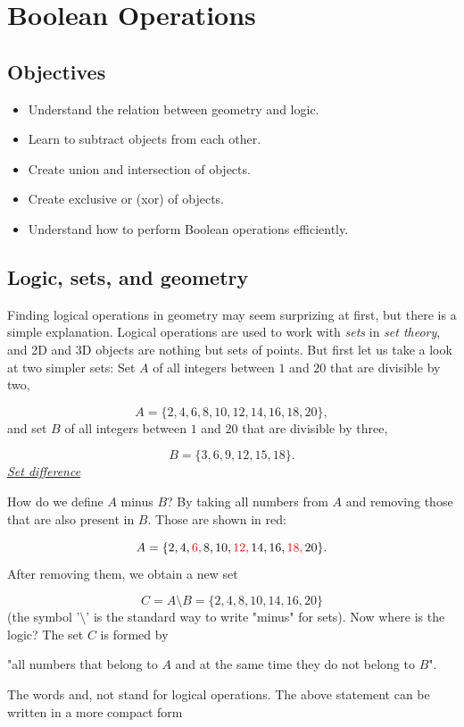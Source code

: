 \section{Boolean Operations}

\subsection{Objectives}
\begin{itemize}
\item Understand the relation between geometry and logic.
\item Learn to subtract objects from each other.
\item Create union and intersection of objects.
\item Create exclusive or (xor) of objects.
\item Understand how to perform Boolean operations efficiently.
\end{itemize}

\subsection{Logic, sets, and geometry}

Finding logical operations in geometry may seem surprizing at first, but there 
is a simple explanation. Logical operations are used to 
work with {\em sets} in {\em set theory}, and 2D and 3D objects are nothing 
but sets of points. But first let us take a look at two simpler sets: 
Set $A$ of all integers between $1$ and $20$ that are divisible by two,

$$
A = \{2, 4, 6, 8, 10, 12, 14, 16, 18, 20\},
$$
and set $B$ of all integers between $1$ and $20$ that are divisible by three,

$$
B = \{3, 6, 9, 12, 15, 18\}.
$$
\underline{\em Set difference}

How do we define $A$ minus $B$? By taking all numbers from $A$ 
and removing those that are also present in $B$. Those are shown in red: 

$$
A = \{2, 4, {\color{red}6,} \,8, 10, {\color{red}12,} \,14, 16, {\color{red}18,} \,20\}.
$$
After removing them, we obtain a new set

$$
C = A \setminus B = \{2, 4, 8, 10, 14, 16, 20\}
$$
(the symbol '$\setminus$' is the standard way to write "minus" for sets).
Now where is the logic? The set $C$ is formed by \\

\centerline{
"all numbers that belong to $A$ {\color{red}and} at the same time they do {\color{red}not} belong to $B$".
}
\vspace{4mm}
\noindent
The words {\color{red}and}, {\color{red}not} stand for logical operations. 
The above statement can be written in a more compact form \\

